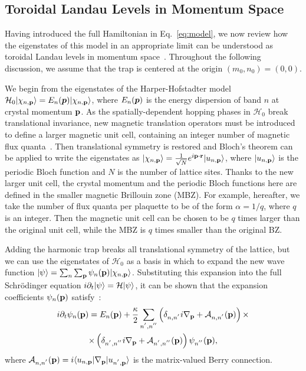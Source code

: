 \subsection{Toroidal Landau Levels in Momentum
Space}\label{sec:eigenstates}

Having introduced the full Hamiltonian in Eq.~\eqref{eq:model}, we now
review how the eigenstates of this model in an appropriate limit can
be understood as toroidal Landau levels in momentum
space~\cite{price2014magnetic}. Throughout the following discussion,
we assume that the trap is centered at the origin $(m_0, n_0)= (0,0)$.

We begin from the eigenstates of the Harper-Hofstadter model
$\mathcal{H}_0\vert \chi_{n,\mathbf{p}} \rangle = E_n (\bm{p})
\vert \chi_{n,\mathbf{p}} \rangle$, where $E_n (\bm{p}) $ is the energy dispersion of
band $n$ at crystal momentum $\mathbf{p}$. As the spatially-dependent
hopping phases in $\mathcal{H}_0$ break translational invariance, new
magnetic translation operators must be introduced to define a larger
magnetic unit cell, containing an integer number of magnetic flux
quanta~\cite{zak1964group, zak1964representations, 1chang}. Then
translational symmetry is restored and Bloch's theorem can be applied
to write the eigenstates as $\vert \chi_{n,\mathbf{p}} \rangle =
\frac{1}{\sqrt{N}} e^{i\mathbf{p}\cdot \mathbf{r}} \vert u_{n,\mathbf{p}} \rangle$, where
$\vert u_{n,\mathbf{p}} \rangle$ is the periodic Bloch function and $N$ is the
number of lattice sites. Thanks to the new larger unit cell, the
crystal momentum and the periodic Bloch functions here are defined in
the smaller magnetic Brillouin zone (MBZ). For example, hereafter, we
take the number of flux quanta per plaquette to be of the form
$\alpha=1/q$, where $q$ is an integer. Then the magnetic unit cell can
be chosen to be $q$ times larger than the original unit cell, while
the MBZ is $q$ times smaller than the original BZ.

Adding the harmonic trap breaks all translational symmetry of the
lattice, but we can use the eigenstates of $\mathcal{H}_0$ as a basis
in which to expand the new wave function $\vert \psi \rangle =
\sum_n\sum_{\mathbf{p}} \psi_n(\mathbf{p})
\vert \chi_{n,\mathbf{p}} \rangle$. Substituting this expansion into the full
Schr\"{o}dinger equation $i \partial_t \vert \psi \rangle = \mathcal{H}
\vert \psi \rangle$, it can be shown that the expansion coefficients
$\psi_n(\mathbf{p})$ satisfy~\cite{price2014magnetic}:
%
\begin{multline} i \partial_t \psi_n(\mathbf{p}) = E_n(\mathbf{p}) +
\frac{\kappa}{2}\sum_{n^{'},n^{''}}\left(\delta_{n,n^{'}}i
\nabla_{\mathbf{p}} + \mathcal{A}_{n,n^{'}}(\mathbf{p})\right)\times \\ \times
\left(\delta_{n^{'},n^{''}}i\nabla_{\mathbf{p}} +
\mathcal{A}_{n^{'},n^{''}}(\mathbf{p})\right) \psi_{n^{''}}(\mathbf{p})
, \label{eq:first}
\end{multline} where $\mathcal{A}_{n,n^{'}}(\mathbf{p}) =
i\langle u_{n,\mathbf{p}} \vert\nabla_{\mathbf{p}}\vert u_{n^{'},\mathbf{p}} \rangle$ is the
matrix-valued Berry connection.


